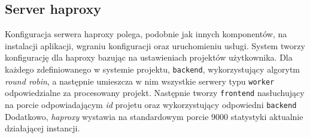 \subsection{Server haproxy}
Konfiguracja serwera haproxy polega, podobnie jak innych komponentów, na instalacji aplikacji, wgraniu konfiguracji oraz uruchomieniu usługi.
System tworzy konfigurację dla haproxy bazując na ustawieniach projektów użytkownika.
Dla każdego zdefiniowanego w systemie projektu, \texttt{backend}, wykorzystujący algorytm \textit{round robin}, a następnie umieszcza w nim wszystkie serwery typu \texttt{worker} odpowiedzialne za procesowany projekt.
Następnie tworzy \texttt{frontend} nasłuchujący na porcie odpowiadającym \textit{id} projetu oraz wykorzystujący odpowiedni \texttt{backend}\\
Dodatkowo, \textit{haproxy} wystawia na standardowym porcie $9000$ statystyki aktualnie działającej instancji.
